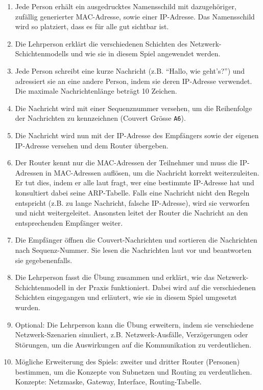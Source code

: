 \begin{enumerate}
	\item Jede Person erhält ein ausgedrucktes Namensschild mit dazugehöriger, zufällig generierter \gls{MAC}-Adresse, sowie einer \gls{IP}-Adresse. Das Namensschild wird so platziert, dass es für alle gut sichtbar ist.
	\item Die Lehrperson erklärt die verschiedenen Schichten des Netzwerk-Schichtenmodells und wie sie in diesem Spiel angewendet werden.
	\item Jede Person schreibt eine kurze Nachricht (z.B. \enquote{Hallo, wie geht's?}) und adressiert sie an eine andere Person, indem sie deren \gls{IP}-Adresse verwendet. Die maximale Nachrichtenlänge beträgt 10 Zeichen.
	\item Die Nachricht wird mit einer Sequenznummer versehen, um die Reihenfolge der Nachrichten zu kennzeichnen (Couvert Grösse \texttt{A6}).
	\item  Die Nachricht wird nun mit der \gls{IP}-Adresse des Empfängers sowie der eigenen \gls{IP}-Adresse versehen und dem Router übergeben.
	\item Der Router kennt nur die \gls{MAC}-Adressen der Teilnehmer und muss die \gls{IP}-Adressen in \gls{MAC}-Adressen auflösen, um die Nachricht korrekt weiterzuleiten. Er tut dies, indem er alle laut fragt, wer eine bestimmte \gls{IP}-Adresse hat und konsultiert dabei seine \gls{ARP}-Tabelle. Falls eine Nachricht nicht den Regeln entspricht (z.B. zu lange Nachricht, falsche IP-Adresse), wird sie verworfen und nicht weitergeleitet. Ansonsten leitet der Router die Nachricht an den entsprechenden Empfänger weiter.
	\item Die Empfänger öffnen die Couvert-Nachrichten und sortieren die Nachrichten nach Sequenz-Nummer. Sie lesen die Nachrichten laut vor und beantworten sie gegebenenfalls.
	\item Die Lehrperson fasst die Übung zusammen und erklärt, wie das Netzwerk-Schichtenmodell in der Praxis funktioniert. Dabei wird auf die verschiedenen Schichten eingegangen und erläutert, wie sie in diesem Spiel umgesetzt wurden.
	\item Optional: Die Lehrperson kann die Übung erweitern, indem sie verschiedene Netzwerk-Szenarien simuliert, z.B. Netzwerk-Ausfälle, Verzögerungen oder Störungen, um die Auswirkungen auf die Kommunikation zu verdeutlichen.
	\item Mögliche Erweiterung des Spiels: zweiter und dritter Router (Personen) bestimmen, um die Konzepte von Subnetzen und Routing zu verdeutlichen. Konzepte: Netzmaske, Gateway, Interface, Routing-Tabelle.
\end{enumerate}
\clearpage

